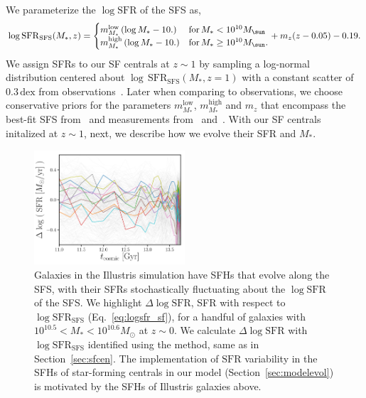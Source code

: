 \documentclass[12pt, letterpaper, preprint, tighten]{aastex62}
\newcommand{\beq}{\begin{equation}}
\newcommand{\eeq}{\end{equation}}
\newcommand{\logsfr}{\log\mathrm{SFR}}
\newcommand{\logsfrsfs}{\log\mathrm{SFR}_\mathrm{SFS}}
\begin{document}
We parameterize the $\log\mathrm{SFR}$ of the SFS as, 
\beq \label{eq:logsfr_ms}
\logsfr_{\rm SFS}(M_*, z) =  \begin{cases}
m^\mathrm{low}_{M_*}\,(\log M_* - 10.)  & \text{for}\,M_* < 10^{10}M_\sun \\
m^\mathrm{high}_{M_*}\,(\log M_* - 10.)  & \text{for}\,M_* \geq 10^{10}M_\sun.
\end{cases}
+ m_z (z - 0.05) - 0.19.
\eeq
We assign SFRs to our SF centrals at $z\sim1$ by sampling a log-normal 
distribution centered about $\log\,\mathrm{SFR}_\mathrm{SFS}(M_*, z=1)$ 
with a constant scatter of $0.3\,\mathrm{dex}$ from observations~\citep{daddi2007, noeske2007, magdis2012, whitaker2012}.
Later when comparing to observations, we choose conservative priors 
for the parameters $m^\mathrm{low}_{M_*}$, $m^\mathrm{high}_{M_*}$ and $m_z$
that encompass the best-fit SFS from~\cite{speagle2014} and measurements 
from~\cite{moustakas2013} and~\cite{lee2015}. With our SF centrals initalized 
at $z \sim 1$, next, we describe how we evolve their SFR and $M_*$.

\begin{figure}
\begin{center}
\includegraphics[width=0.5\textwidth]{figs/illustris_sfh.pdf} 
    \caption{Galaxies in the Illustris simulation have SFHs that evolve along the
    SFS, with their SFRs stochastically fluctuating about the $\logsfr$ of the SFS.
    We highlight $\Delta \logsfr$, SFR with respect to $\logsfrsfs$ (Eq.~\ref{eq:logsfr_sf}), 
    for a handful of galaxies with $10^{10.5}< M_* < 10^{10.6}M_\odot$ at $z\sim0$. 
    We calculate $\Delta \logsfr$ with $\logsfrsfs$ identified using the \cite{hahn2018a} 
    method, same as in Section~\ref{sec:sfcen}. The implementation of $\mathrm{SFR}$
    variability in the SFHs of star-forming centrals in our model 
    (Section~\ref{sec:modelevol}) is motivated by the SFHs of Illustris galaxies above.}
\label{fig:illsfh}
\end{center}
\end{figure}
\end{document}
